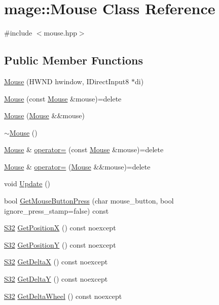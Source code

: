 \hypertarget{classmage_1_1_mouse}{}\section{mage\+:\+:Mouse Class Reference}
\label{classmage_1_1_mouse}


{\ttfamily \#include $<$mouse.\+hpp$>$}

\subsection*{Public Member Functions}
\begin{DoxyCompactItemize}
\item 
\hyperlink{classmage_1_1_mouse_ad02365977dab44603400ac6f24e0df97}{Mouse} (H\+W\+ND hwindow, I\+Direct\+Input8 $\ast$di)
\item 
\hyperlink{classmage_1_1_mouse_af11aa23e6cfbefb4cd3d90b17c63db7c}{Mouse} (const \hyperlink{classmage_1_1_mouse}{Mouse} \&mouse)=delete
\item 
\hyperlink{classmage_1_1_mouse_ad91b06f0a0df67eefc972997169d12c2}{Mouse} (\hyperlink{classmage_1_1_mouse}{Mouse} \&\&mouse)
\item 
\hyperlink{classmage_1_1_mouse_a855f1075ae774c8417d3da7a1e02d580}{$\sim$\+Mouse} ()
\item 
\hyperlink{classmage_1_1_mouse}{Mouse} \& \hyperlink{classmage_1_1_mouse_a585119f1b0db3fbc7436c86676518c8c}{operator=} (const \hyperlink{classmage_1_1_mouse}{Mouse} \&mouse)=delete
\item 
\hyperlink{classmage_1_1_mouse}{Mouse} \& \hyperlink{classmage_1_1_mouse_a42d80f535a12356762a506438036dd71}{operator=} (\hyperlink{classmage_1_1_mouse}{Mouse} \&\&mouse)=delete
\item 
void \hyperlink{classmage_1_1_mouse_a0cddae3f871dd69c1ba6928dc6b1f985}{Update} ()
\item 
bool \hyperlink{classmage_1_1_mouse_a9c8d4493c86685b259819b5995a17c7a}{Get\+Mouse\+Button\+Press} (char mouse\+\_\+button, bool ignore\+\_\+press\+\_\+stamp=false) const
\item 
\hyperlink{namespacemage_a642e05c5c83642b6946703615cdbf2da}{S32} \hyperlink{classmage_1_1_mouse_a0b7b47556aaa6e620d852349e21ba4af}{Get\+PositionX} () const noexcept
\item 
\hyperlink{namespacemage_a642e05c5c83642b6946703615cdbf2da}{S32} \hyperlink{classmage_1_1_mouse_a4df9cf5c235c44a5988cd451b8ca3ddb}{Get\+PositionY} () const noexcept
\item 
\hyperlink{namespacemage_a642e05c5c83642b6946703615cdbf2da}{S32} \hyperlink{classmage_1_1_mouse_a1f6c7164c1705d834c2f603f22398077}{Get\+DeltaX} () const noexcept
\item 
\hyperlink{namespacemage_a642e05c5c83642b6946703615cdbf2da}{S32} \hyperlink{classmage_1_1_mouse_a95da9aa89fc63d4d96666da52e63d558}{Get\+DeltaY} () const noexcept
\item 
\hyperlink{namespacemage_a642e05c5c83642b6946703615cdbf2da}{S32} \hyperlink{classmage_1_1_mouse_ad683097cc0cec09eb5c2ad1b17bd729f}{Get\+Delta\+Wheel} () const noexcept
\end{DoxyCompactItemize}
